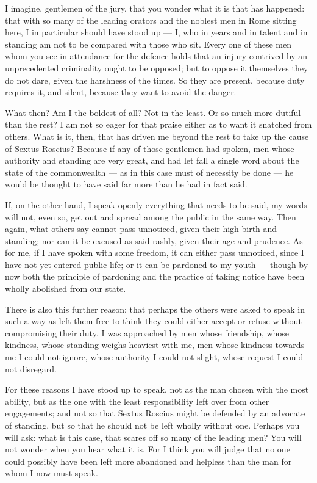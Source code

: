 
 I imagine, gentlemen of the jury, that you wonder what it is that has happened: that with so many of the leading orators and the noblest men in Rome sitting here, I in particular should have stood up --- I, who in years and in talent and in standing am not to be compared with those who sit. Every one of these men whom you see in attendance for the defence holds that an injury contrived by an unprecedented criminality ought to be opposed; but to oppose it themselves they do not dare, given the harshness of the times. So they are present, because duty requires it, and silent, because they want to avoid the danger.

 What then? Am I the boldest of all? Not in the least. Or so much more dutiful than the rest? I am not so eager for that praise either as to want it snatched from others. What is it, then, that has driven me beyond the rest to take up the cause of Sextus Roscius? Because if any of those gentlemen had spoken, men whose authority and standing are very great, and had let fall a single word about the state of the commonwealth --- as in this case must of necessity be done --- he would be thought to have said far more than he had in fact said.

 If, on the other hand, I speak openly everything that needs to be said, my words will not, even so, get out and spread among the public in the same way. Then again, what others say cannot pass unnoticed, given their high birth and standing; nor can it be excused as said rashly, given their age and prudence. As for me, if I have spoken with some freedom, it can either pass unnoticed, since I have not yet entered public life; or it can be pardoned to my youth --- though by now both the principle of pardoning and the practice of taking notice have been wholly abolished from our state.

 There is also this further reason: that perhaps the others were asked to speak in such a way as left them free to think they could either accept or refuse without compromising their duty. I was approached by men whose friendship, whose kindness, whose standing weighs heaviest with me, men whose kindness towards me I could not ignore, whose authority I could not slight, whose request I could not disregard.

 For these reasons I have stood up to speak, not as the man chosen with the most ability, but as the one with the least responsibility left over from other engagements; and not so that Sextus Roscius might be defended by an advocate of standing, but so that he should not be left wholly without one. Perhaps you will ask: what is this case, that scares off so many of the leading men? You will not wonder when you hear what it is. For I think you will judge that no one could possibly have been left more abandoned and helpless than the man for whom I now must speak.


